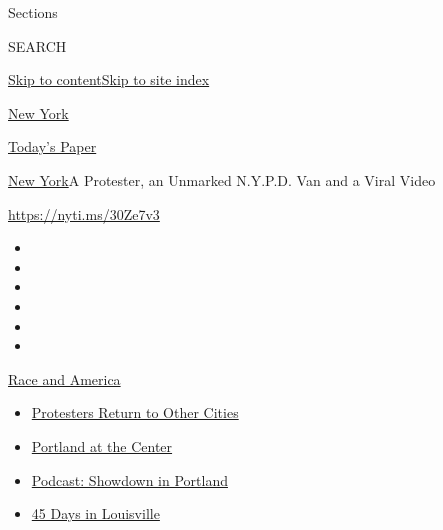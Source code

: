 Sections

SEARCH

\protect\hyperlink{site-content}{Skip to
content}\protect\hyperlink{site-index}{Skip to site index}

\href{https://www.nytimes3xbfgragh.onion/section/nyregion}{New York}

\href{https://myaccount.nytimes3xbfgragh.onion/auth/login?response_type=cookie\&client_id=vi}{}

\href{https://www.nytimes3xbfgragh.onion/section/todayspaper}{Today's
Paper}

\href{/section/nyregion}{New York}\textbar{}A Protester, an Unmarked
N.Y.P.D. Van and a Viral Video

\url{https://nyti.ms/30Ze7v3}

\begin{itemize}
\item
\item
\item
\item
\item
\item
\end{itemize}

\href{https://www.nytimes3xbfgragh.onion/news-event/george-floyd-protests-minneapolis-new-york-los-angeles?action=click\&pgtype=Article\&state=default\&region=TOP_BANNER\&context=storylines_menu}{Race
and America}

\begin{itemize}
\tightlist
\item
  \href{https://www.nytimes3xbfgragh.onion/2020/07/26/us/protests-portland-seattle-trump.html?action=click\&pgtype=Article\&state=default\&region=TOP_BANNER\&context=storylines_menu}{Protesters
  Return to Other Cities}
\item
  \href{https://www.nytimes3xbfgragh.onion/2020/07/24/us/portland-oregon-protests-white-race.html?action=click\&pgtype=Article\&state=default\&region=TOP_BANNER\&context=storylines_menu}{Portland
  at the Center}
\item
  \href{https://www.nytimes3xbfgragh.onion/2020/07/23/podcasts/the-daily/portland-protests.html?action=click\&pgtype=Article\&state=default\&region=TOP_BANNER\&context=storylines_menu}{Podcast:
  Showdown in Portland}
\item
  \href{https://www.nytimes3xbfgragh.onion/interactive/2020/07/16/us/black-lives-matter-protests-louisville-breonna-taylor.html?action=click\&pgtype=Article\&state=default\&region=TOP_BANNER\&context=storylines_menu}{45
  Days in Louisville}
\end{itemize}

